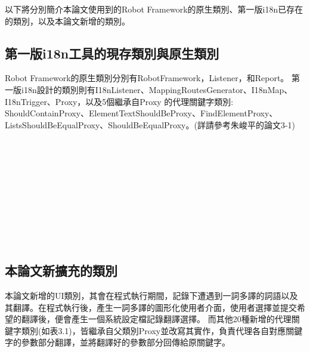 以下將分別簡介本論文使用到的Robot Framework的原生類別、第一版i18n已存在的類別，以及本論文新增的類別。

\subsection{第一版i18n工具的現存類別與原生類別}
Robot Framework的原生類別分別有RobotFramework，Listener，和Report。
第一版i18n設計的類別則有I18nListener、MappingRoutesGenerator、I18nMap、I18nTrigger、Proxy，以及5個繼承自Proxy \cite{proxy} 的代理關鍵字類別: ShouldContainProxy、ElementTextShouldBeProxy、FindElementProxy、ListsShouldBeEqualProxy、ShouldBeEqualProxy。(詳請參考朱峻平的論文3-1)

 \hspace*{\fill} \\
\\ \hspace*{\fill} \\
\\ \hspace*{\fill} \\
\\ \hspace*{\fill} \\
\\ \hspace*{\fill} \\
\subsection{本論文新擴充的類別}
本論文新增的UI類別，其會在程式執行期間，記錄下遭遇到一詞多譯的詞語以及其翻譯。在程式執行後，產生一詞多譯的圖形化使用者介面，使用者選擇並提交希望的翻譯後，便會產生一個系統設定檔記錄翻譯選擇。
而其他20種新增的代理關鍵字類別(如表3.1)，皆繼承自父類別Proxy並改寫其實作，負責代理各自對應關鍵字的參數部分翻譯，並將翻譯好的參數部分回傳給原關鍵字。
\hspace*{\fill} \\

